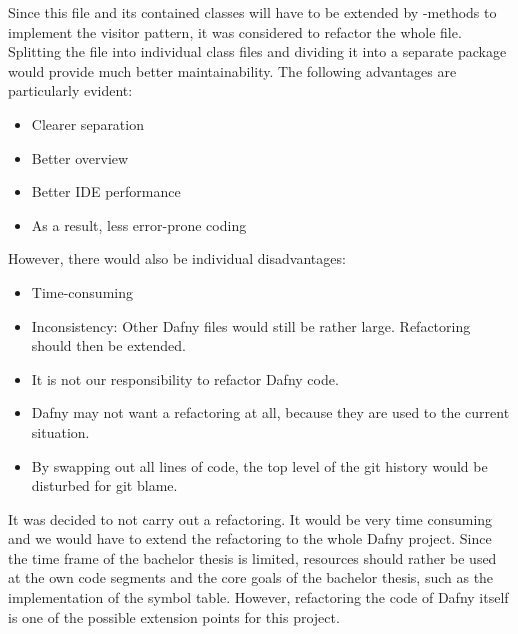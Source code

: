 Since this file and its contained classes will have to be extended by -methods
to implement the visitor pattern, it was considered to refactor the whole file.\\

Splitting the file into individual class files and dividing it into a separate package would provide much better maintainability.
The following advantages are particularly evident:
\begin{itemize}
    \item Clearer separation
    \item Better overview
    \item Better IDE performance
    \item As a result, less error-prone coding
\end{itemize}

However, there would also be individual disadvantages:
\begin{itemize}
    \item Time-consuming
    \item Inconsistency: Other Dafny files would still be rather large. Refactoring should then be extended.
    \item It is not our responsibility to refactor Dafny code.
    \item Dafny may not want a refactoring at all, because they are used to the current situation.
    \item By swapping out all lines of code, the top level of the git history would be disturbed for git blame.
\end{itemize}

It was decided to not carry out a refactoring.
It would be very time consuming and we would have to extend the refactoring to the whole Dafny project.
Since the time frame of the bachelor thesis is limited, resources should rather be used at the own code segments and the core goals of the bachelor thesis, such as the implementation of the symbol table.
However, refactoring the code of Dafny itself is one of the possible extension points for this project.




